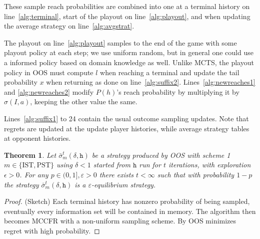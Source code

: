 \documentclass{aamas2015}
\newcounter{mlNoteCounter}
\newcommand{\mlnote}[1]{{\scriptsize \color{darkgreen} $\blacksquare$ \refstepcounter{mlNoteCounter}\textsf{[ML]$_{\arabic{mlNoteCounter}}$:{#1}}}}
\newcommand{\tth}{\mathtt{h}}
\newtheorem{theorem}{Theorem}
\begin{document}
These sample reach probabilities are combined into one at a terminal history on line~\ref{alg:terminal}, 
start of the playout on line~\ref{alg:playout}, and when updating the average 
strategy on line~\ref{alg:avgstrat}. 


The playout on line~\ref{alg:playout} samples to the end of the game with some playout policy at each step; we use uniform random, 
but in general one could use a informed policy based on domain knowledge as well. 
Unlike MCTS, the playout policy in OOS must compute $l$ when reaching a terminal and update the tail probability $x$ when returning
as done on line~\ref{alg:suffix2}. Lines~\ref{alg:newreaches1} and \ref{alg:newreaches2} modify $P(h)$'s reach probability 
by multiplying it by $\sigma(I,a)$, keeping the other value the same.

Lines~\ref{alg:suffix1} to 24
contain the usual outcome sampling updates. Note that regrets are updated at the 
update player histories, while average strategy tables at opponent histories. 

\begin{theorem}
Let $\bar{\sigma}^t_m(\delta,\tth)$ be a strategy produced by OOS with scheme 1$m \in \{ \mbox{IST}, \mbox{PST} \}$ 
using $\delta < 1$ started from $\tth$ run for $t$ iterations, with exploration $\epsilon > 0$.  
For any $p \in (0, 1], \varepsilon > 0$ there exists $t < \infty$ such that with 
probability $1-p$ the strategy  $\bar{\sigma}^t_m(\delta,\tth)$ is a $\varepsilon$-equilibrium strategy. 
\label{thm:consistency}
\end{theorem}
\begin{proof}(Sketch) Each terminal history has nonzero probability of being sampled, eventually every information 
set will be contained in memory. The algorithm then becomes MCCFR with a non-uniform sampling scheme.
By \cite[Theorem 5]{Lanctot09Sampling} OOS minimizes regret with high probability.
\end{proof}
\end{document}
